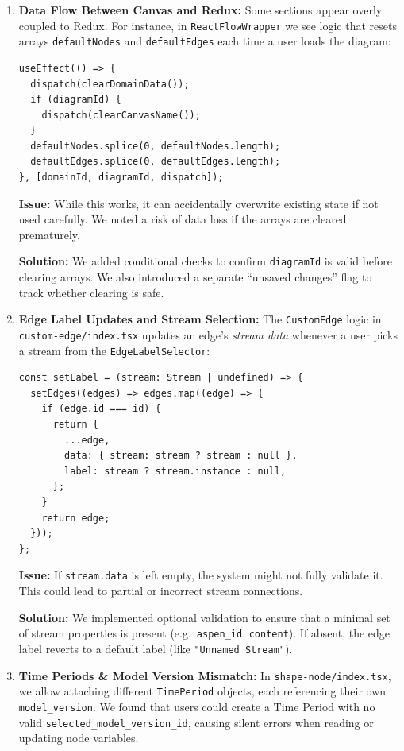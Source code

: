\documentclass{article}
\begin{document}
\begin{enumerate}
  \item \textbf{Data Flow Between Canvas and Redux:} 
  Some sections appear overly coupled to Redux. For instance, in \texttt{ReactFlowWrapper} we see logic that resets arrays \texttt{defaultNodes} and \texttt{defaultEdges} each time a user loads the diagram:

  \begin{verbatim}
useEffect(() => {
  dispatch(clearDomainData());
  if (diagramId) {
    dispatch(clearCanvasName());
  }
  defaultNodes.splice(0, defaultNodes.length);
  defaultEdges.splice(0, defaultEdges.length);
}, [domainId, diagramId, dispatch]);
  \end{verbatim}

  \textbf{Issue:} While this works, it can accidentally overwrite existing state if not used carefully. We noted a risk of data loss if the arrays are cleared prematurely.

  \textbf{Solution:} We added conditional checks to confirm \texttt{diagramId} is valid before clearing arrays. We also introduced a separate “unsaved changes” flag to track whether clearing is safe.

  \item \textbf{Edge Label Updates and Stream Selection:} 
  The \texttt{CustomEdge} logic in \texttt{custom-edge/index.tsx} updates an edge’s \emph{stream data} whenever a user picks a stream from the \texttt{EdgeLabelSelector}:
  \begin{verbatim}
const setLabel = (stream: Stream | undefined) => {
  setEdges((edges) => edges.map((edge) => {
    if (edge.id === id) {
      return {
        ...edge,
        data: { stream: stream ? stream : null },
        label: stream ? stream.instance : null,
      };
    }
    return edge;
  }));
};
  \end{verbatim}

  \textbf{Issue:} If \texttt{stream.data} is left empty, the system might not fully validate it. This could lead to partial or incorrect stream connections.

  \textbf{Solution:} We implemented optional validation to ensure that a minimal set of stream properties is present (e.g.\ \texttt{aspen\_id}, \texttt{content}). If absent, the edge label reverts to a default label (like \texttt{"Unnamed Stream"}).

  \item \textbf{Time Periods \& Model Version Mismatch:} 
  In \texttt{shape-node/index.tsx}, we allow attaching different \texttt{TimePeriod} objects, each referencing their own \texttt{model\_version}. We found that users could create a Time Period with no valid \texttt{selected\_model\_version\_id}, causing silent errors when reading or updating node variables.


\end{enumerate}
\end{document}
